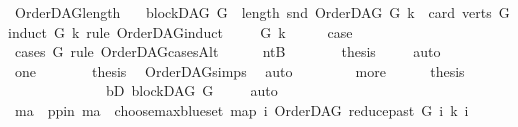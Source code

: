 \begin{isabellebody}
\isanewline
\isanewline
{}\isamarkupfalse%
\ OrderDAG{\isacharunderscore}{\kern0pt}length{\isacharcolon}{\kern0pt}\isanewline
\ \ \ {\isachardoublequoteopen}blockDAG\ G\ {\isasymLongrightarrow}\ length\ {\isacharparenleft}{\kern0pt}snd\ {\isacharparenleft}{\kern0pt}OrderDAG\ G\ k{\isacharparenright}{\kern0pt}{\isacharparenright}{\kern0pt}\ {\isacharequal}{\kern0pt}\ card\ {\isacharparenleft}{\kern0pt}verts\ G{\isacharparenright}{\kern0pt}{\isachardoublequoteclose}\isanewline
%
\isadelimproof
%
\endisadelimproof
%
\isatagproof
{}\isamarkupfalse%
{\isacharparenleft}{\kern0pt}induct\ G\ k\ rule{\isacharcolon}{\kern0pt}\ OrderDAG{\isachardot}{\kern0pt}induct{\isacharparenright}{\kern0pt}\isanewline
\ \ \isamarkupfalse%
\ {\isacharparenleft}{\kern0pt}{}\ G\ k{\isacharparenright}{\kern0pt}\isanewline
\ \ \isamarkupfalse%
\ \isamarkupfalse%
\ {\isacharquery}{\kern0pt}case\ \isamarkupfalse%
\ {\isacharparenleft}{\kern0pt}cases\ G\ rule{\isacharcolon}{\kern0pt}\ OrderDAG{\isacharunderscore}{\kern0pt}casesAlt{\isacharparenright}{\kern0pt}\isanewline
\ \ \ \ \isamarkupfalse%
\ ntB\isanewline
\ \ \ \ \isamarkupfalse%
\ \isamarkupfalse%
\ {\isacharquery}{\kern0pt}thesis\ \isamarkupfalse%
\ {}\ \isamarkupfalse%
\ auto\isanewline
\ \ \isamarkupfalse%
\isanewline
\ \ \ \ \isamarkupfalse%
\ one\isanewline
\ \ \ \ \isamarkupfalse%
\ \isamarkupfalse%
\ {\isacharquery}{\kern0pt}thesis\ \isamarkupfalse%
\ OrderDAG{\isachardot}{\kern0pt}simps\ \isamarkupfalse%
\ auto\isanewline
\ \ \isamarkupfalse%
\isanewline
\ \ \ \ \isamarkupfalse%
\ more\isanewline
\ \ \ \ \isamarkupfalse%
\ {\isacharquery}{\kern0pt}thesis\ \isamarkupfalse%
\ {}\isanewline
\ \ \ \ \isamarkupfalse%
\ {\isacharminus}{\kern0pt}\isanewline
\ \ \ \ \ \ \isamarkupfalse%
\ bD{\isacharcolon}{\kern0pt}\ {\isachardoublequoteopen}blockDAG\ G{\isachardoublequoteclose}\ \isamarkupfalse%
\ {}\ \isamarkupfalse%
\ auto\isanewline
\ \ \ \ \ \ \isamarkupfalse%
\ ma\ \ pp{\isacharunderscore}{\kern0pt}in{\isacharcolon}{\kern0pt}\ {\isachardoublequoteopen}ma\ {\isacharequal}{\kern0pt}\ {\isacharparenleft}{\kern0pt}choose{\isacharunderscore}{\kern0pt}max{\isacharunderscore}{\kern0pt}blue{\isacharunderscore}{\kern0pt}set\ {\isacharparenleft}{\kern0pt}map\ {\isacharparenleft}{\kern0pt}{\isasymlambda}i{\isachardot}{\kern0pt}\ {\isacharparenleft}{\kern0pt}OrderDAG\ {\isacharparenleft}{\kern0pt}reduce{\isacharunderscore}{\kern0pt}past\ G\ i{\isacharparenright}{\kern0pt}\ k{\isacharcomma}{\kern0pt}\ i{\isacharparenright}{\kern0pt}{\isacharparenright}{\kern0pt}\isanewline

\end{isabellebody}
